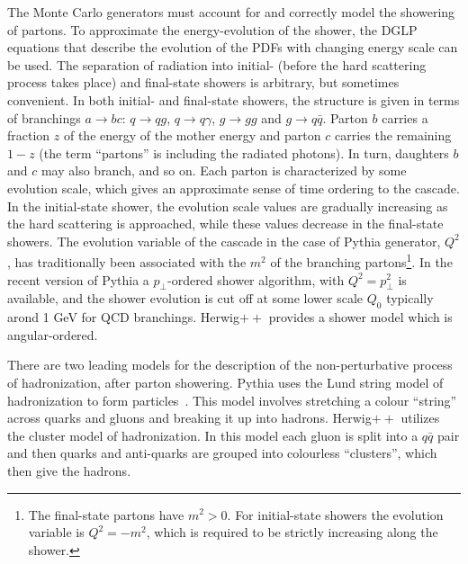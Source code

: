 The Monte Carlo generators must account for and correctly model the showering of partons. To approximate the energy-evolution of the shower, the DGLP equations that describe the evolution of the PDFs with changing energy scale can be used. The separation of radiation into initial- (before the hard scattering process takes place) and final-state showers is arbitrary, but sometimes convenient.  In both initial- and final-state showers, the structure is given in terms of branchings $a \rightarrow bc$: $q \rightarrow qg$, $q \rightarrow q\gamma$, $g \rightarrow gg$ and $g \rightarrow q\bar{q}$. Parton $b$ carries a fraction $z$ of the energy of the mother energy and parton $c$ carries the remaining $1-z$ (the term ``partons'' is including the radiated photons).  In turn, daughters $b$ and $c$ may also branch, and so on. Each parton is characterized by some evolution scale, which gives an approximate sense of time ordering to the cascade. In the initial-state shower,  the evolution scale values are gradually increasing as the hard scattering is approached, while  these values decrease in the final-state showers. The evolution variable of the cascade in the case of {\sc Pythia} generator, $Q^2$, has traditionally been associated with the $m^2$ of the branching partons\footnote{The final-state partons have $m^2>0$. For initial-state showers the evolution variable is $Q^2=-m^2$, which is required to be strictly increasing along the shower.}. In the recent version of {\sc Pythia} a $p_{\perp}$-ordered shower algorithm, with $Q^2=p_{\perp}^2$ is available, and the shower evolution is cut off at some lower scale  $Q_0$ typically arond 1 GeV for QCD branchings. {\sc Herwig}$++$ provides a shower model which is angular-ordered.

There are two leading models for the description of the non-perturbative process of hadronization, after parton showering. {\sc Pythia} uses the Lund string model of hadronization to form particles~\cite{LUNDMODEL}.  This model involves stretching a colour ``string'' across quarks and gluons and breaking it up into hadrons.%
{\sc Herwig}$++$ utilizes the cluster model of hadronization. In this model each gluon is split into a $q\bar{q}$ pair and then quarks and anti-quarks are grouped into colourless ``clusters'', which then give the hadrons.

